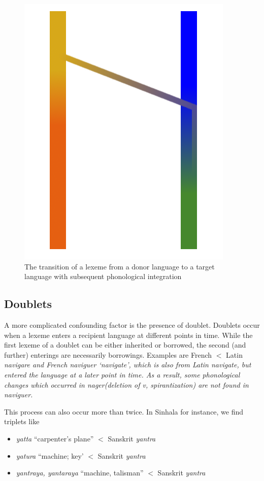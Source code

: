 \documentclass[a4paper,10pt]{article}
\newcommand{\trs}[2]{\textit{#1} `#2'}
\begin{document}
\begin{figure}
\centering
    \includegraphics[height=.3\textheight]{borrowing.png}
\caption{The transition of a lexeme from a donor language to a target language with subsequent phonological integration}
\end{figure}

\subsection{Doublets}
A more complicated confounding factor is the presence of doublet. Doublets occur when a lexeme enters a recipient language at different points in time. While the first lexeme of a doublet can be either inherited or borrowed, the second (and further) enterings are necessarily borrowings. Examples are French $<$ Latin \em navigare \em and French \trs{naviguer}{navigate}, which is also from Latin \em navigate\em, but entered the language at a later point in time. As a result, some phonological changes which occurred in \em nager\em (deletion of \em v\em, spirantization) are not found in \em naviguer\em.

This process can also occur more than twice. In Sinhala for instance, we find triplets like
\begin{itemize}
   \item  {\em yatta} ``carpenter's plane'' $<$ Sanskrit {\em yantra}
   \item {\em yatura} ``machine; key' $<$ Sanskrit {\em yantra}
   \item {\em yantraya, yantaraya\em} ``machine, talisman'' $<$ Sanskrit {\em yantra}
\end{itemize}
\end{document}
